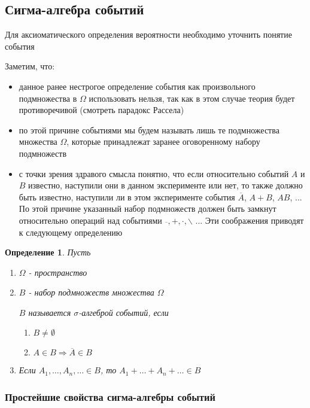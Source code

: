 \documentclass[a4paper, 14pt]{report}
\newtheorem{defenition}{Определение}[section]
\begin{document}
\subsection{Сигма-алгебра событий}

Для аксиоматического определения вероятности необходимо уточнить понятие события

Заметим, что:

\begin{itemize}
    \item данное ранее нестрогое определение события как произвольного подмножества в $\Omega$ использовать нельзя, так как в этом случае теория будет противоречивой (смотреть парадокс Рассела)
    \item по этой причине событиями мы будем называть лишь те подмножества множества $\Omega$, которые принадлежат заранее оговоренному набору подмножеств
    \item с точки зрения здравого смысла понятно, что если относительно событий $A$ и $B$ известно, наступили они в данном эксперименте или нет, то также должно быть известно, наступили ли в этом эксперименте события $\overline{A}$, $A+B$, $AB$, ... По этой причине указанный набор подмножеств должен быть замкнут относительно операций над событиями $\overline{}, +, \cdot, \backslash$ ... Эти соображения приводят к следующему определению
\end{itemize}

\begin{defenition}
    Пусть
    \begin{enumerate}
        \item $\Omega$ - пространство 
        \item $B$ - набор подмножеств множества $\Omega$

            $B$ называется $\sigma$-алгеброй событий, если
            \begin{enumerate}
                \item $B \ne \emptyset$
                \item $A \in B \Rightarrow \overline{A} \in B$
            \end{enumerate}

        \item Если $A_1, \dots, A_n, \dots \in B$, то $A_1 + \dots + A_n + \dots \in B$
    \end{enumerate}
\end{defenition}

\subsubsection{Простейшие свойства сигма-алгебры событий}
\end{document}
